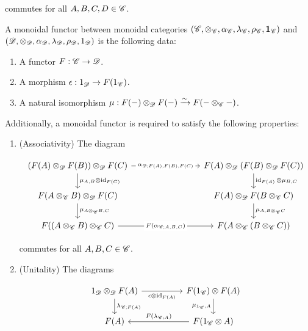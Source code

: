\begin{definition}
\begin{enumerate}
commutes for all $A,B,C,D\in \mathscr{C}$.
\end{enumerate}

\raggedleft\qedsymbol{}
\end{definition}

\begin{definition} A monoidal functor between monoidal categories $(\mathscr{C},\otimes_{\mathscr{C}}, \alpha_{\mathscr{C}},\lambda_{\mathscr{C}},\rho_{\mathscr{C}},\mathbf{1}_{\mathscr{C}})$ and $(\mathscr{D},\otimes_{\mathscr{D}},\alpha_{\mathscr{D}},\lambda_{\mathscr{D}},\rho_{\mathscr{D}},1_{\mathscr{D}})$ is the following data:

\begin{enumerate}
\item A functor $F: \mathscr{C}\to \mathscr{D}$.
\item A morphism $\epsilon:1_{\mathscr{D}}\to F(1_{\mathscr{C}})$.
\item A natural isomorphism $\mu: F(\--)\otimes_{\mathscr{D}}F(\--)\xrightarrow{\sim}F(\--\otimes_{\mathscr{C}}\--)$.
\end{enumerate}

Additionally, a monoidal functor is required to satisfy the following properties:

\begin{enumerate}
\item (Associativity) The diagram

\[\begin{tikzcd}
	{(F(A)\otimes_{\Dcat}F(B))\otimes_{\Dcat}F(C)} &&& {F(A)\otimes_{\Dcat}(F(B)\otimes_{\Dcat}F(C))} \\
	{F(A\otimes_{\C}B)\otimes_{\Dcat}F(C)} &&& {F(A)\otimes_{\Dcat}F(B\otimes_{\C}C)} \\
	{F((A\otimes_{\C} B)\otimes_{\C}C)} && {} & {F(A\otimes_{\C}(B\otimes_{\C}C))}
	\arrow["{\mu_{A,B}\otimes \id_{F(C)}}", from=1-1, to=2-1]
	\arrow["{\mu_{A\otimes_{\C}B,C}}", from=2-1, to=3-1]
	\arrow["{\mu_{A,B\otimes_{\C}C}}", from=2-4, to=3-4]
	\arrow["{\id_{F(A)}\otimes\mu_{B,C}}", from=1-4, to=2-4]
	\arrow["{F(\alpha_{\C;A,B,C})}"{description}, from=3-1, to=3-4]
	\arrow["{\alpha_{\Dcat;F(A),F(B),F(C)}}"{description}, from=1-1, to=1-4]
\end{tikzcd}\]

commutes for all $A,B,C\in \mathscr{C}$.

\item (Unitality) The diagrams

\[\begin{tikzcd}
	{1_{\Dcat}\otimes_{\Dcat}F(A)} && {F(1_{\C})\otimes F(A)} \\
	{F(A)} && {F(1_{\C}\otimes A)}
	\arrow["{\lambda_{\C;F(A)}}", from=1-1, to=2-1]
	\arrow["{F(\lambda_{\C;A})}"', from=2-3, to=2-1]
	\arrow["{\mu_{1_{\C},A}}"', from=1-3, to=2-3]
	\arrow["{\epsilon\otimes \id_{F(A)}}"', from=1-1, to=1-3]
\end{tikzcd}\]


\end{enumerate}
\end{definition}
